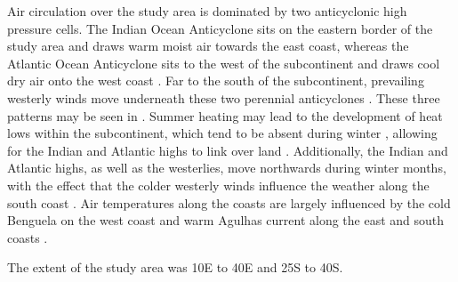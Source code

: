 \documentclass[a4paper,10pt,review]{elsarticle}
\begin{document}
Air circulation over the study area is dominated by two anticyclonic high pressure cells. The Indian Ocean Anticyclone sits on the eastern border of the study area and draws warm moist air towards the east coast, whereas the Atlantic Ocean Anticyclone sits to the west of the subcontinent and draws cool dry air onto the west coast \citep{vanHeerden1998}. Far to the south of the subcontinent, prevailing westerly winds move underneath these two perennial anticyclones \citep{vanHeerden1998}. These three patterns may be seen in . Summer heating may lead to the development of heat lows within the subcontinent, which tend to be absent during winter \citep{Tyson2000}, allowing for the Indian and Atlantic highs to link over land \citep{vanHeerden1998}. Additionally, the Indian and Atlantic highs, as well as the westerlies, move northwards during winter months, with the effect that the colder westerly winds influence the weather along the south coast \citep{vanHeerden1998}. Air temperatures along the coasts are largely influenced by the cold Benguela on the west coast and warm Agulhas current along the east and south coasts \citep{vanHeerden1998}.

The extent of the study area was 10\degree E to 40\degree E and 25\degree S to 40\degree S.
\end{document}
